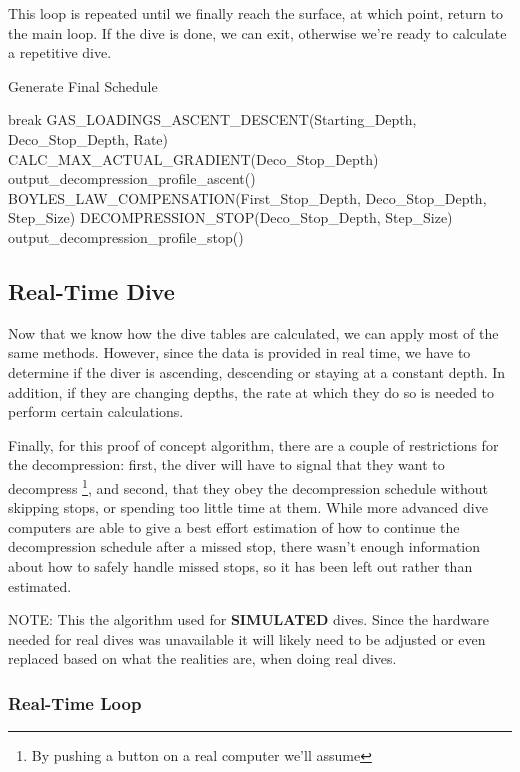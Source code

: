 \documentclass[12pt]{article}
\begin{document}
This loop is repeated until we finally reach the surface, at which point, return to the main loop.
If the dive is done, we can exit, otherwise we're ready to calculate a repetitive dive.

\begin{algorithm}
\caption{Generate Final Schedule}
\label{pre5}
\begin{algorithmic}
\STATE  break
\ENDIF
\STATE GAS\_LOADINGS\_ASCENT\_DESCENT(Starting\_Depth, Deco\_Stop\_Depth, Rate)
\STATE CALC\_MAX\_ACTUAL\_GRADIENT(Deco\_Stop\_Depth)
\STATE output\_decompression\_profile\_ascent()
\STATE BOYLES\_LAW\_COMPENSATION(First\_Stop\_Depth, Deco\_Stop\_Depth, Step\_Size)
\STATE DECOMPRESSION\_STOP(Deco\_Stop\_Depth, Step\_Size)
\STATE output\_decompression\_profile\_stop()
\ENDWHILE
\end{algorithmic}
\end{algorithm}

\subsection{Real-Time Dive}

Now that we know how the dive tables are calculated, we can apply most of the same methods. However,
since the data is provided in real time, we have to determine if the diver is ascending, descending
or staying at a constant depth. In addition, if they are changing depths, the rate at which they
do so is needed to perform certain calculations.

Finally, for this proof of concept algorithm, there are a couple of restrictions for the
decompression: first, the diver will have to signal that they want to decompress \footnote{By pushing a button
on a real computer we'll assume}, and second, that they obey the decompression 
schedule without skipping stops, or spending too
little time at them. While more advanced dive computers are able to give a best effort estimation of how to
continue the decompression schedule after a missed stop, there wasn't enough information about
how to safely handle missed stops, so it has been left out rather than estimated.

NOTE: This the algorithm used for \textbf{SIMULATED} dives. Since the hardware needed for real dives
was unavailable it will likely need to be adjusted or even replaced based on what the realities are, 
when doing real dives.

\subsubsection{Real-Time Loop}
\end{document}
